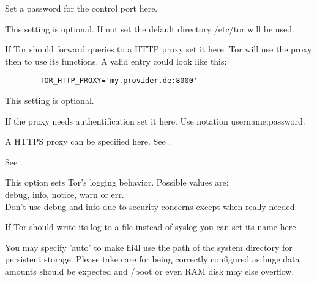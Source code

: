 \begin{description}

        Set a password for the control port here.


        This setting is optional. If not set the default directory /etc/tor
        will be used.


        {If Tor should forward queries to a HTTP proxy set it here.
        Tor will use the proxy then to use its functions. A valid entry
        could look like this:

\begin{example}
\begin{verbatim}
        TOR_HTTP_PROXY='my.provider.de:8000'
\end{verbatim}
\end{example}
        This setting is optional.}


        If the proxy needs authentification set it here. Use notation
        username:password.


        A HTTPS proxy can be specified here. See
        .


        See .


        {This option sets Tor's logging behavior. Possible values are: \\
        debug, info, notice, warn or err. \\
        Don't use debug and info due to security concerns except when really needed.}


        If Tor should write its log to a file instead of syslog
        you can set its name here.

        You may specify 'auto' to make fli4l use the path of the system
        directory for persistent storage. Please take care for 
        being correctly configured as huge data amounts should be expected and
       /boot or even RAM disk may else overflow.

\end{description}
